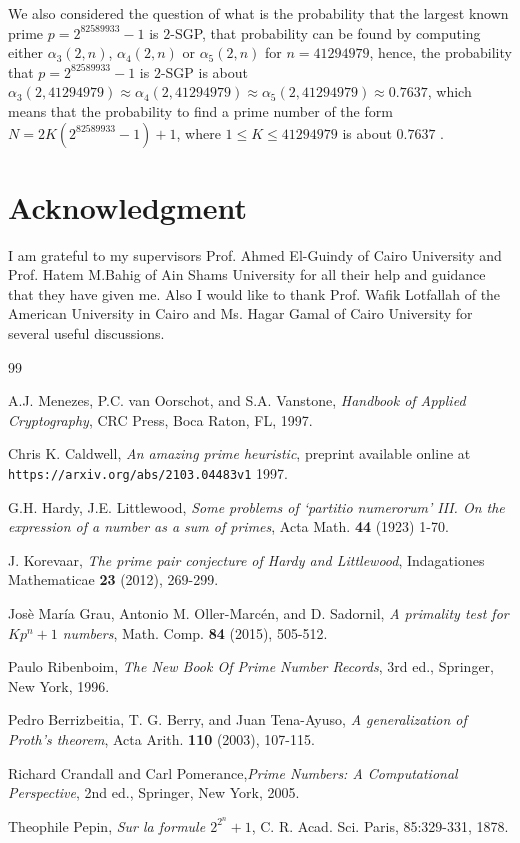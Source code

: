 \documentclass{amsart}
\numberwithin{equation}{section}
\begin{document}
We also considered the question of what is the probability that the largest known prime $p=2^{82589933}-1$ is $2$-SGP, that probability can be found by computing either $\alpha_3(2,n)$, $\alpha_4(2,n)$ or $\alpha_5(2,n)$ for $n=41294979$, hence, the probability that $p=2^{82589933}-1$ is $2$-SGP is about $\alpha_3(2,41294979) \approx \alpha_4(2,41294979) \approx \alpha_5(2,41294979) \approx 0.7637$, which means that the probability to find a prime number of the form $N=2K(2^{82589933}-1)+1$, where $1 \leq K \leq 41294979$ is about $0.7637$ .



\section*{Acknowledgment}
I am grateful to my supervisors Prof. Ahmed El-Guindy of Cairo University and Prof. Hatem M.Bahig of Ain Shams University for all their help and guidance that they have given me. Also I would like to thank Prof. Wafik Lotfallah of the American University in Cairo and Ms. Hagar Gamal of Cairo University for several useful discussions.

\begin{thebibliography}{99}
	
 A.J. Menezes, P.C. van Oorschot, and S.A. Vanstone, \emph{Handbook of Applied Cryptography}, CRC Press, Boca Raton, FL, 1997.	
	
 Chris K. Caldwell, \emph{An amazing prime heuristic}, preprint available online at {\tt https://arxiv.org/abs/2103.04483v1} 1997.

 G.H. Hardy, J.E. Littlewood, \emph{Some problems of ‘partitio numerorum’ III. On the expression of a number as a sum of primes}, Acta Math. {\bf 44} (1923) 1-70.	
	
 J. Korevaar, \emph{The prime pair conjecture of Hardy and Littlewood}, Indagationes Mathematicae {\bf 23} (2012), 269-299.

 Jos\`e Mar\'ia Grau, Antonio M. Oller-Marc\'en, and D. Sadornil, \emph{A primality test for  $Kp^n+1$ numbers}, Math. Comp. {\bf 84} (2015), 505-512.

 Paulo Ribenboim, \emph{The New Book Of Prime Number Records},  3rd ed., Springer, New York, 1996.
	
 Pedro Berrizbeitia, T. G. Berry, and Juan Tena-Ayuso, \emph{A generalization of Proth's theorem}, Acta Arith. {\bf 110} (2003), 107-115. 

 Richard Crandall and Carl Pomerance,\emph{Prime Numbers: A Computational Perspective}, 2nd ed., Springer, New York, 2005.

 Theophile Pepin, \emph{Sur la formule $2^{2^n}+1$}, C. R. Acad. Sci. Paris, 85:329-331, 1878. 
	
\end{thebibliography}
\end{document}
